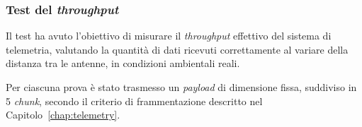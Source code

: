 \documentclass[12pt,a4paper,twoside]{book}
\begin{document}
    \begin{table}[H]
        \centering
        \caption{Condizioni del test del throughput (PDF).}
        \label{tab:T1-conditions-pdf}
    \end{table}
\fi

\subsubsection{Test del \emph{throughput}}

Il test ha avuto l’obiettivo di misurare il \emph{throughput} effettivo del
sistema di telemetria, valutando la quantità di dati ricevuti correttamente al
variare della distanza tra le antenne, in condizioni ambientali reali.

Per ciascuna prova è stato trasmesso un \emph{payload} di dimensione fissa,
suddiviso in 5 \emph{chunk}, secondo il criterio di frammentazione descritto nel
Capitolo~\ref{chap:telemetry}.
\end{document}

